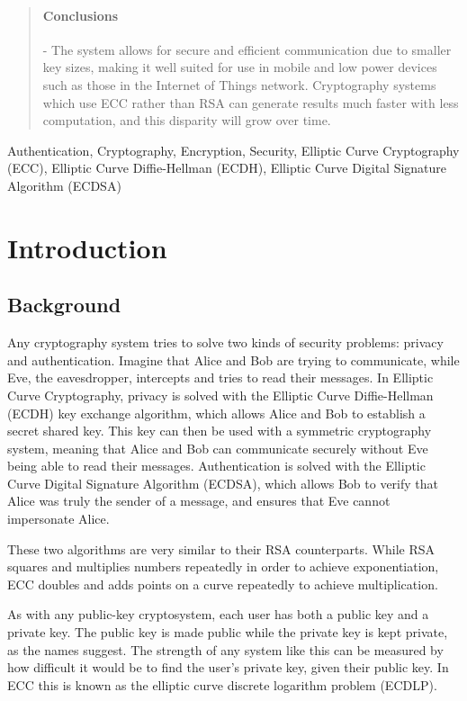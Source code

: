 \documentclass[12pt,a4paper]{article}
\begin{document}
\begin{abstract}
    \vspace{-5mm}
    \paragraph{Conclusions} -
    The system allows for secure and efficient communication due to smaller key sizes, making it well suited for use in mobile and low power devices such as those in the Internet of Things network. 
    Cryptography systems which use ECC rather than RSA can generate results much faster with less computation, and this disparity will grow over time. 

\end{abstract}


\begin{keywords}
Authentication, Cryptography, Encryption, Security, Elliptic Curve Cryptography (ECC), Elliptic Curve Diffie-Hellman (ECDH), 
Elliptic Curve Digital Signature Algorithm (ECDSA)
\end{keywords}


\section{Introduction}

\subsection{Background} \noindent
Any cryptography system tries to solve two kinds of security problems: privacy and authentication. 
Imagine that Alice and Bob are trying to communicate, while Eve, the eavesdropper, intercepts and tries to read their messages. 
In Elliptic Curve Cryptography, privacy is solved with the Elliptic Curve Diffie-Hellman (ECDH) key exchange algorithm, 
which allows Alice and Bob to establish a secret shared key. 
This key can then be used with a symmetric cryptography system, meaning that Alice and Bob can communicate securely without Eve being able to read their messages. 
Authentication is solved with the Elliptic Curve Digital Signature Algorithm (ECDSA), 
which allows Bob to verify that Alice was truly the sender of a message, and ensures that Eve cannot impersonate Alice. 

These two algorithms are very similar to their RSA counterparts. 
While RSA squares and multiplies numbers repeatedly in order to achieve exponentiation, 
ECC doubles and adds points on a curve repeatedly to achieve multiplication. 

As with any public-key cryptosystem, each user has both a public key and a private key. 
The public key is made public while the private key is kept private, as the names suggest. 
The strength of any system like this can be measured by how difficult it would be to find the user's private key, given their public key. 
In ECC this is known as the elliptic curve discrete logarithm problem (ECDLP). 
\end{document}
